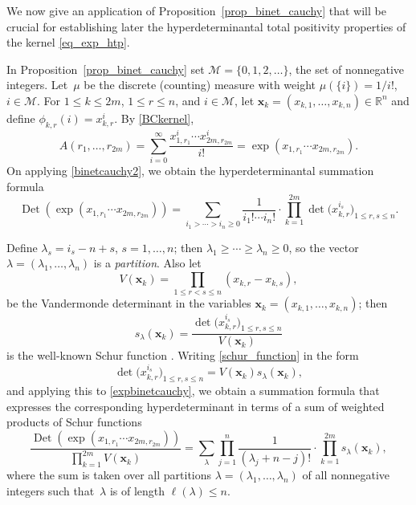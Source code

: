 \documentclass[10pt,a4paper]{amsart}
\numberwithin{equation}{section}
\def\R{{\mathbb R}}
\def\Det{\operatorname{Det}}
\def\mcalM{\mathcal{M}}
\def\xx{\boldsymbol{x}}
\begin{document}
We now give an application of Proposition~\ref{prop_binet_cauchy} that will be crucial for establishing later the hyperdeterminantal total positivity properties of the kernel \eqref{eq_exp_htp}.

\begin{Example}
\label{exponentialhyperdet}
In Proposition~\ref{prop_binet_cauchy} set $\mcalM = \{0,1,2,\dots\}$, the set of nonnegative integers. Let~$\mu$ be the discrete (counting) measure with weight $\mu(\{i\}) = 1/i!$, $i \in \mcalM$. For $1 \le k \le 2m$, $1 \le r \le n$, and $i \in \mcalM$, let $\xx_k = (x_{k,1},\dots,x_{k,n}) \in \R^n$ and define $\phi_{k,r}(i) = x_{k,r}^i$. By \eqref{BCkernel},
\[
A(r_1,\dots,r_{2m}) = \sum_{i=0}^\infty \dfrac{x_{1,r_1}^i \cdots x_{2m,r_{2m}}^i}{i!}
= \exp(x_{1,r_1} \cdots x_{2m,r_{2m}}).
\]
On applying \eqref{binetcauchy2}, we obtain the hyperdeterminantal summation formula
\begin{equation}
\Det(\exp(x_{1,r_1} \cdots x_{2m,r_{2m}})) = \sum_{i_1 > \cdots > i_n \ge 0} \frac{1}{i_1! \cdots i_n!} \cdot \prod_{k=1}^{2m} \det\bigl(x_{k,r}^{i_s}\bigr)_{1 \le r,s\le n}.\label{expbinetcauchy}
\end{equation}

Define $\lambda_s = i_s - n + s$, $s=1,\dots,n$; then $\lambda_1 \ge \cdots \ge \lambda_n \ge 0$, so the vector $\lambda = (\lambda_1,\dots,\lambda_n)$ is a {\it partition}. Also let
\begin{equation}
V(\xx_k) = \prod_{1 \le r < s \le n} (x_{k,r} - x_{k,s}),\label{eq_vandermonde}
\end{equation}
be the Vandermonde determinant in the variables $\xx_k = (x_{k,1},\dots,x_{k,n})$; then
\begin{equation}
s_\lambda(\xx_k) = \frac{\det\bigl(x_{k,r}^{i_s}\bigr)_{1 \le r,s\le n}}{V(\xx_k)}\label{schur_function}
\end{equation}
is the well-known Schur function \cite[p.~40]{macdonald}. Writing \eqref{schur_function} in the form
\begin{equation}
\det\bigl(x_{k,r}^{i_s}\bigr)_{1 \le r,s\le n} = V(\xx_k) s_\lambda(\xx_k),\label{schurhyperdet}
\end{equation}
and applying this to \eqref{expbinetcauchy}, we obtain a summation formula that expresses the corresponding hyperdeterminant in terms of a sum of weighted products of Schur functions
\begin{equation}
\frac{\Det(\exp(x_{1,r_1} \cdots x_{2m,r_{2m}}))}{\prod_{k=1}^{2m} V(\xx_k)} = \sum_\lambda \prod_{j=1}^n \frac{1}{(\lambda_j + n-j)!} \cdot \prod_{k=1}^{2m} s_\lambda(\xx_k),\label{schurhyperdetsum}
\end{equation}
where the sum is taken over all partitions $\lambda = (\lambda_1,\dots,\lambda_n)$ of all nonnegative integers such that~$\lambda$ is of length $\ell(\lambda) \le n$.
\end{Example}
\end{document}
